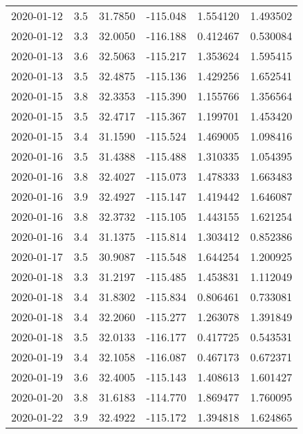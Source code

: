 \begin{tabular}{lrrrrr}
2020-01-12 &       3.5 &  31.7850 &  -115.048 &         1.554120 &         1.493502 \\
2020-01-12 &       3.3 &  32.0050 &  -116.188 &         0.412467 &         0.530084 \\
2020-01-13 &       3.6 &  32.5063 &  -115.217 &         1.353624 &         1.595415 \\
2020-01-13 &       3.5 &  32.4875 &  -115.136 &         1.429256 &         1.652541 \\
2020-01-15 &       3.8 &  32.3353 &  -115.390 &         1.155766 &         1.356564 \\
2020-01-15 &       3.5 &  32.4717 &  -115.367 &         1.199701 &         1.453420 \\
2020-01-15 &       3.4 &  31.1590 &  -115.524 &         1.469005 &         1.098416 \\
2020-01-16 &       3.5 &  31.4388 &  -115.488 &         1.310335 &         1.054395 \\
2020-01-16 &       3.8 &  32.4027 &  -115.073 &         1.478333 &         1.663483 \\
2020-01-16 &       3.9 &  32.4927 &  -115.147 &         1.419442 &         1.646087 \\
2020-01-16 &       3.8 &  32.3732 &  -115.105 &         1.443155 &         1.621254 \\
2020-01-16 &       3.4 &  31.1375 &  -115.814 &         1.303412 &         0.852386 \\
2020-01-17 &       3.5 &  30.9087 &  -115.548 &         1.644254 &         1.200925 \\
2020-01-18 &       3.3 &  31.2197 &  -115.485 &         1.453831 &         1.112049 \\
2020-01-18 &       3.4 &  31.8302 &  -115.834 &         0.806461 &         0.733081 \\
2020-01-18 &       3.4 &  32.2060 &  -115.277 &         1.263078 &         1.391849 \\
2020-01-18 &       3.5 &  32.0133 &  -116.177 &         0.417725 &         0.543531 \\
2020-01-19 &       3.4 &  32.1058 &  -116.087 &         0.467173 &         0.672371 \\
2020-01-19 &       3.6 &  32.4005 &  -115.143 &         1.408613 &         1.601427 \\
2020-01-20 &       3.8 &  31.6183 &  -114.770 &         1.869477 &         1.760095 \\
2020-01-22 &       3.9 &  32.4922 &  -115.172 &         1.394818 &         1.624865 \\

\end{tabular}
